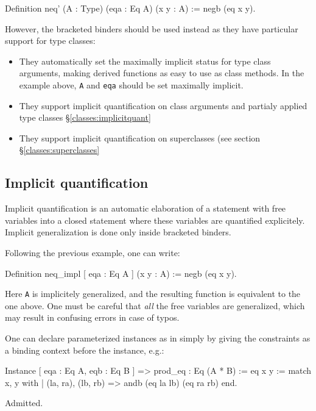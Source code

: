 \begin{coq_example}
  Definition neq' (A : Type) (eqa : Eq A) (x y : A) := negb (eq x y).
\end{coq_example}

However, the bracketed binders should be used instead as they have
particular support for type classes:
\begin{itemize}
\item They automatically set the maximally implicit status for type
  class arguments, making derived functions as easy to use as class
  methods. In the example above, \texttt{A} and \texttt{eqa} should be
  set maximally implicit.
\item They support implicit quantification on class arguments and
  partialy applied type classes \S \ref{classes:implicitquant}
\item They support implicit quantification on superclasses (see section
  \S \ref{classes:superclasses}
\end{itemize}

\subsection{Implicit quantification}

Implicit quantification is an automatic elaboration of a statement with
free variables into a closed statement where these variables are
quantified explicitely. Implicit generalization is done only inside
bracketed binders.

Following the previous example, one can write:
\begin{coq_example}
  Definition neq_impl [ eqa : Eq A ] (x y : A) := negb (eq x y).
\end{coq_example}

Here \texttt{A} is implicitely generalized, and the resulting function
is equivalent to the one above. One must be careful that \emph{all} the
free variables are generalized, which may result in confusing errors in
case of typos. 


One can declare parameterized instances as in \Haskell simply by giving
the constraints as a binding context before the instance, e.g.:

\begin{coq_example*}
Instance [ eqa : Eq A, eqb : Eq B ] => prod_eq : Eq (A * B) :=
  eq x y := match x, y with
  | (la, ra), (lb, rb) => andb (eq la lb) (eq ra rb)
  end.
\end{coq_example*}
\begin{coq_eval}
Admitted.
\end{coq_eval}

